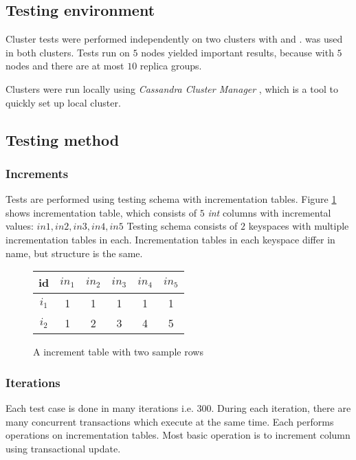 \subsection{Testing environment}
Cluster tests were performed independently on two clusters with  and .  was used in both clusters.
Tests run on $5$ nodes yielded important results, because with $5$ nodes and  there are at most $10$ replica groups. 

Clusters were run locally using \emph{Cassandra Cluster Manager} \cite{ccm}, which is a tool to quickly set up local cluster.

\subsection{Testing method}

\subsubsection{Increments}
Tests are performed using testing schema with incrementation tables. Figure \ref{fig:incrementationTable} shows incrementation table, which consists of $5$  \emph{int} columns with incremental values: $in1,in2,in3,in4,in5$
Testing schema consists of $2$ keyspaces with multiple incrementation tables in each. Incrementation tables in each keyspace differ in name, but structure is the same.

\begin{figure}[h]
\centering
\begin{tabular}{c||c|c|c|c|c}
        \toprule
        id 		 & $in_{1}$ & $in_{2}$ & $in_{3}$ & $in_{4}$ & $in_{5}$ \\ \midrule
        $i_{1}$ & 1  & 1  & 1  &  1 & 1  \\
        $i_{2}$ & 1  & 2  & 3  &  4 & 5  \\ \bottomrule
      \end{tabular}
      \caption{A increment table with two sample rows}
  \label{fig:incrementationTable}
\end{figure}

\subsubsection{Iterations}
Each test case is done in many iterations i.e. $300$. During each iteration, there are many concurrent transactions which execute at the same time. Each \transaction performs operations on incrementation tables. Most basic operation is to increment column using transactional update.

